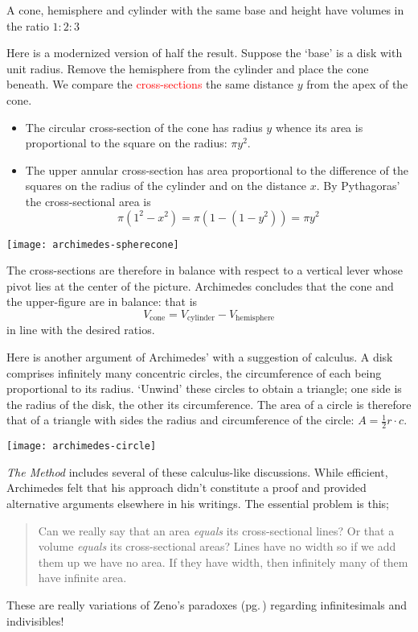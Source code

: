 \begin{thm*}{}{}
A cone, hemisphere and cylinder with the same base and height have volumes in the ratio $1:2:3$
\end{thm*}
\label{pg:archmethod}

\begin{minipage}[t]{0.67\linewidth}\vspace{0pt}
Here is a modernized version of half the result.\smallbreak
Suppose the `base' is a disk with unit radius. Remove the hemisphere from the cylinder and place the cone beneath. We compare the \textcolor{red}{cross-sections} the same distance $y$ from the apex of the cone.
\begin{itemize}\itemsep0pt
  \item The circular cross-section of the cone has radius $y$ whence its area is proportional to the square on the radius: $\pi y^2$.
	\item The upper annular cross-section has area proportional to the difference of the squares on the radius of the cylinder and on the distance $x$. By Pythagoras' the cross-sectional area is
	\[\pi(1^2-x^2)=\pi(1-(1-y^2))=\pi y^2\]
\end{itemize}
\end{minipage}\hfill\begin{minipage}[t]{0.32\linewidth}\vspace{0pt}
\flushright\texttt{[image: archimedes-spherecone]}
\end{minipage}
The cross-sections are therefore in balance with respect to a vertical lever whose pivot lies at the center of the picture. Archimedes concludes that the cone and the upper-figure are in balance: that is
\[V_\text{cone}=V_\text{cylinder}-V_\text{hemisphere}\]
in line with the desired ratios.\bigbreak

Here is another argument of Archimedes' with a suggestion of calculus. A disk comprises infinitely many concentric circles, the circumference of each being proportional to its radius. `Unwind' these circles to obtain a triangle; one side is the radius of the disk, the other its circumference. The area of a circle is therefore that of a triangle with sides the radius and circumference of the circle: $A=\frac 12r\cdot c$.
\begin{center}
\texttt{[image: archimedes-circle]}
\end{center}

\emph{The Method} includes several of these calculus-like discussions. While efficient, Archimedes felt that his approach didn't constitute a proof and provided alternative arguments elsewhere in his writings. The essential problem is this;
\begin{quote}
  Can we really say that an area \emph{equals} its cross-sectional lines? Or that a volume \emph{equals} its cross-sectional areas? Lines have no width so if we add them up we have no area. If they have width, then infinitely many of them have infinite area.
\end{quote}
These are really variations of Zeno's paradoxes (pg.\,\pageref{pg:zeno}) regarding infinitesimals and indivisibles!\goodbreak

